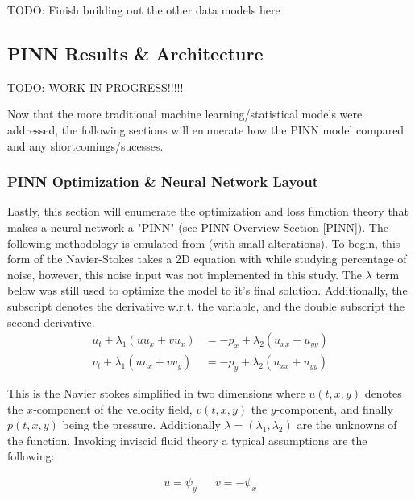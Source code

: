 \documentclass{article}
\begin{document}
TODO: Finish building out the other data models here

\subsection{PINN Results \& Architecture}

TODO: WORK IN PROGRESS!!!!!

Now that the more traditional machine learning/statistical models were
addressed, the following sections will enumerate how the PINN model compared
and any shortcomings/sucesses.

\subsubsection{PINN Optimization \& Neural Network Layout}
\noindent Lastly, this section will enumerate the optimization and loss
function theory that makes a neural network a "PINN" (see PINN Overview Section
\ref{PINN}). The following methodology is emulated from
\citeauthor{DBLP:journals/corr/abs-1711-10566}\cite{DBLP:journals/corr/abs-1711-10566}(with
small alterations). To begin, this form of the Navier-Stokes takes a 2D
equation  with while studying percentage of noise, however, this noise input
was not implemented in this study. The $\lambda$ term below was still used to
optimize the model to
it's final solution. Additionally, the subscript denotes the derivative
w.r.t. the variable, and the double subscript the second derivative.\\

\begin{equation}
	\begin{aligned}
		u_{t} + \lambda_{1} (u u_{x} + v u_{x}) & = - p_{x} +
		\lambda_{2}(u_{xx} + u_{yy})                          \\
		v_{t} + \lambda_{1} (u v_{x} + v v_{y}) & = - p_{y} +
		\lambda_{2}(u_{xx} + u_{yy})
	\end{aligned}
\end{equation}

\noindent This is the Navier stokes simplified in two dimensions where
$ u(t,x,y) $ denotes the $x$-component of the velocity field, $ v(t,x,y) $ the
$y$-component, and finally $ p(t,x,y) $ being the pressure. Additionally
$\lambda = (\lambda_{1}, \lambda_{2})$ are the unknowns of the function.
Invoking inviscid fluid theory a typical assumptions are the following:

\begin{align}
	u = \psi_{y} &  & v = -\psi_{x}
\end{align}
\end{document}

